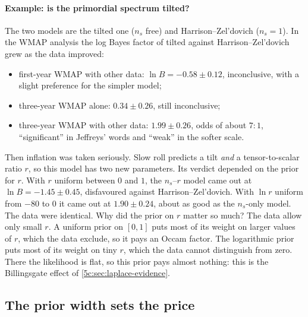\paragraph{Example: is the primordial spectrum tilted?}
The two models are the tilted one ($n_s$ free) and Harrison--Zel'dovich ($n_s=1$). In
the WMAP analysis  the log Bayes factor of tilted
against Harrison--Zel'dovich grew as the data improved:
\begin{itemize}[itemsep=1pt,leftmargin=1.2em]
  \item first-year WMAP with other data: $\ln B=-0.58\pm0.12$, inconclusive, with a
        slight preference for the simpler model;
  \item three-year WMAP alone: $0.34\pm0.26$, still inconclusive;
  \item three-year WMAP with other data: $1.99\pm0.26$, odds of about $7:1$,
        ``significant'' in Jeffreys' words and ``weak'' in the softer scale.
\end{itemize}
Then inflation was taken seriously. Slow roll predicts a tilt \emph{and} a
tensor-to-scalar ratio $r$, so this model has two new parameters. Its verdict depended
on the prior for $r$. With $r$ uniform between $0$ and $1$, the $n_s$--$r$ model came
out at $\ln B=-1.45\pm0.45$, disfavoured against Harrison--Zel'dovich. With $\ln r$
uniform from $-80$ to $0$ it came out at $1.90\pm0.24$, about as good as the
$n_s$-only model. The data were identical. Why did the prior on $r$ matter so much?
The data allow only small $r$. A uniform prior on $[0,1]$ puts most of its weight on
larger values of $r$, which the data exclude, so it pays an Occam factor. The
logarithmic prior puts most of its weight on tiny $r$, which the data cannot
distinguish from zero. There the likelihood is flat, so this prior pays almost
nothing: this is the Billingsgate effect of \cref{5c:sec:laplace-evidence}.

\subsection{The prior width sets the price}
\label{5c:sec:prior-width}

